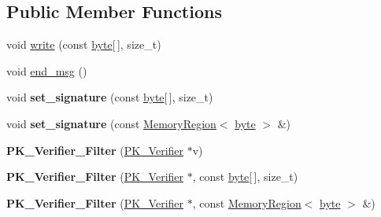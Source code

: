 \subsection*{Public Member Functions}
\begin{DoxyCompactItemize}
\item 
void \hyperlink{classBotan_1_1PK__Verifier__Filter_a2378e077c1e1398ac2f7fbef380f7ba0}{write} (const \hyperlink{namespaceBotan_a7d793989d801281df48c6b19616b8b84}{byte}\mbox{[}$\,$\mbox{]}, size\-\_\-t)
\item 
void \hyperlink{classBotan_1_1PK__Verifier__Filter_a3ee9a74944f713790bf89a70e2f77095}{end\-\_\-msg} ()
\item 
\hypertarget{classBotan_1_1PK__Verifier__Filter_a3476797c4928c3c09e464d71b6ea4bdd}{void {\bfseries set\-\_\-signature} (const \hyperlink{namespaceBotan_a7d793989d801281df48c6b19616b8b84}{byte}\mbox{[}$\,$\mbox{]}, size\-\_\-t)}\label{classBotan_1_1PK__Verifier__Filter_a3476797c4928c3c09e464d71b6ea4bdd}

\item 
\hypertarget{classBotan_1_1PK__Verifier__Filter_aec7c9053538761a8c97d726cc1f9de7d}{void {\bfseries set\-\_\-signature} (const \hyperlink{classBotan_1_1MemoryRegion}{Memory\-Region}$<$ \hyperlink{namespaceBotan_a7d793989d801281df48c6b19616b8b84}{byte} $>$ \&)}\label{classBotan_1_1PK__Verifier__Filter_aec7c9053538761a8c97d726cc1f9de7d}

\item 
\hypertarget{classBotan_1_1PK__Verifier__Filter_a5e29dd42db770ddda38a7cd1cc39d9fa}{{\bfseries P\-K\-\_\-\-Verifier\-\_\-\-Filter} (\hyperlink{classBotan_1_1PK__Verifier}{P\-K\-\_\-\-Verifier} $\ast$v)}\label{classBotan_1_1PK__Verifier__Filter_a5e29dd42db770ddda38a7cd1cc39d9fa}

\item 
\hypertarget{classBotan_1_1PK__Verifier__Filter_ad94d4820235dfb3ff91e11082024ed7e}{{\bfseries P\-K\-\_\-\-Verifier\-\_\-\-Filter} (\hyperlink{classBotan_1_1PK__Verifier}{P\-K\-\_\-\-Verifier} $\ast$, const \hyperlink{namespaceBotan_a7d793989d801281df48c6b19616b8b84}{byte}\mbox{[}$\,$\mbox{]}, size\-\_\-t)}\label{classBotan_1_1PK__Verifier__Filter_ad94d4820235dfb3ff91e11082024ed7e}

\item 
\hypertarget{classBotan_1_1PK__Verifier__Filter_ae6d52b9eac93a2bf2bcf492534e8b32e}{{\bfseries P\-K\-\_\-\-Verifier\-\_\-\-Filter} (\hyperlink{classBotan_1_1PK__Verifier}{P\-K\-\_\-\-Verifier} $\ast$, const \hyperlink{classBotan_1_1MemoryRegion}{Memory\-Region}$<$ \hyperlink{namespaceBotan_a7d793989d801281df48c6b19616b8b84}{byte} $>$ \&)}\label{classBotan_1_1PK__Verifier__Filter_ae6d52b9eac93a2bf2bcf492534e8b32e}

\end{DoxyCompactItemize}
